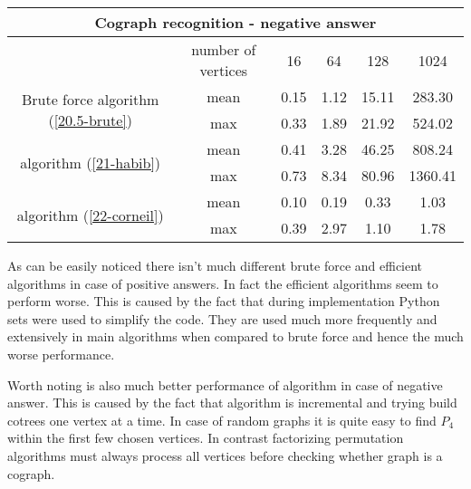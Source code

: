 \begin{center}

    \begin{tabular}{ |c|c|c|c|c|c|}
        \hline
        \multicolumn{6}{|c|}{Cograph recognition - negative answer}                                                       \\
        \hline
                                                                     & number of vertices & 16   & 64   & 128   & 1024    \\
        \hline
        \multirow{2}{*}{Brute force algorithm (\ref{20.5-brute})}    & mean               & 0.15 & 1.12 & 15.11 & 283.30  \\
                                                                     & max                & 0.33 & 1.89 & 21.92 & 524.02  \\
        \hline
        \multirow{2}{*}{\cite{habib} algorithm (\ref{21-habib})}     & mean               & 0.41 & 3.28 & 46.25 & 808.24  \\
                                                                     & max                & 0.73 & 8.34 & 80.96 & 1360.41 \\
        \hline
        \multirow{2}{*}{\cite{corneil} algorithm (\ref{22-corneil})} & mean               & 0.10 & 0.19 & 0.33  & 1.03    \\
                                                                     & max                & 0.39 & 2.97 & 1.10  & 1.78    \\

        \hline
    \end{tabular}
\end{center}

As can be easily noticed there isn't much different brute force and efficient algorithms in case of positive answers. In fact the efficient algorithms seem to perform worse. This is caused by the fact that during implementation Python sets were used to simplify the code. They are used much more frequently and extensively in main algorithms when compared to brute force and hence the much worse performance.

Worth noting is also much better performance of \cite{corneil} algorithm in case of negative answer. This is caused by the fact that algorithm is incremental and trying build cotrees one vertex at a time. In case of random graphs it is quite easy to find $P_4$ within the first few chosen vertices. In contrast factorizing permutation algorithms must always process all vertices before checking whether graph is a cograph.

